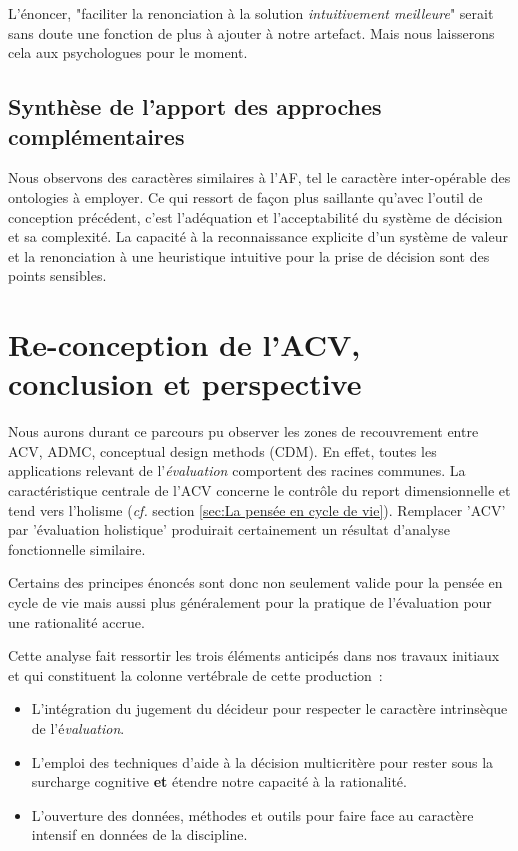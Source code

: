L'énoncer, "faciliter la renonciation à la solution \emph{intuitivement meilleure}" serait sans doute une fonction de plus à ajouter à notre artefact.
Mais nous laisserons cela aux psychologues pour le moment.

\subsection{Synthèse de l'apport des approches complémentaires}
Nous observons des caractères similaires à l'\gls{AF}, tel le caractère inter-opérable des ontologies à employer.
Ce qui ressort de façon plus saillante qu'avec l'outil de conception précédent, c'est l'adéquation et l'acceptabilité du système de décision et sa complexité.
La capacité à la reconnaissance explicite d'un système de valeur et la renonciation à une heuristique intuitive pour la prise de décision sont des points sensibles.
\section{Re-conception de l'ACV, conclusion et perspective}
\label{sec:Re-conception de l'ACV, conclusion et perspective}

Nous aurons durant ce parcours pu observer les zones de recouvrement entre \gls{ACV}, \gls{ADMC}, conceptual design methods (CDM).
En effet, toutes les applications relevant de l'\emph{évaluation} comportent des racines communes.
La caractéristique centrale de l'\gls{ACV} concerne le contrôle du report dimensionnelle et tend vers l'holisme (\textit{cf.} section \ref{sec:La pensée en cycle de vie}).
Remplacer '\gls{ACV}' par 'évaluation holistique' produirait certainement un résultat d'analyse fonctionnelle similaire.

Certains des principes énoncés sont donc non seulement valide pour la pensée en cycle de vie mais aussi plus généralement pour la pratique de l'évaluation pour une rationalité accrue.

Cette analyse fait ressortir les trois éléments anticipés dans nos travaux initiaux~\cite{patard_life_2015} et qui constituent la colonne vertébrale de cette production~:
\begin{itemize}
\item L'intégration du jugement du décideur pour respecter le caractère intrinsèque de l'é\emph{valuation}.
\item L'emploi des techniques d'aide à la décision multicritère pour rester sous la surcharge cognitive \textbf{et} étendre notre capacité à la rationalité.
\item L'ouverture des données, méthodes et outils pour faire face au caractère intensif en données de la discipline.
\end{itemize}

